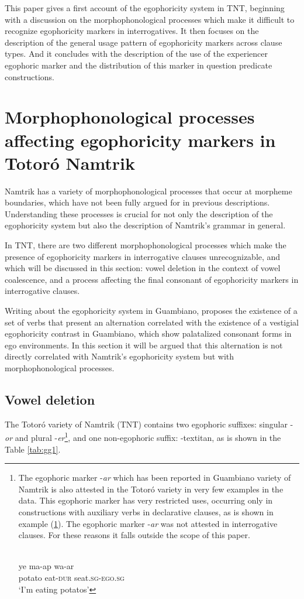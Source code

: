 \documentclass[output=paper]{langsci/langscibook}
\begin{document}
This paper gives a first account of the egophoricity system in TNT, beginning with a discussion on the morphophonological processes which make it difficult to recognize egophoricity markers in interrogatives. It then focuses on the description of the general usage pattern of egophoricity markers across clause types. And it concludes with the description of the use of the experiencer egophoric marker and the distribution of this marker in question predicate constructions.
  

\section{Morphophonological processes affecting egophoricity markers in Totoró Namtrik}\label{s:gg1}

Namtrik has a variety of morphophonological processes that occur at morpheme boundaries, which have not been fully argued for in previous descriptions. Understanding these processes is crucial for not only the description of the egophoricity system but also the description of Namtrik’s grammar in general. 

In TNT, there are two different morphophonological processes which make the presence of egophoricity markers in interrogative clauses unrecognizable, and which will be discussed in this section: vowel deletion in the context of vowel coalescence, and a process affecting the final consonant of egophoricity markers in interrogative clauses.

Writing about the egophoricity system in Guambiano, \citet{Norcliffe2018} proposes the existence of a set of verbs that present an alternation correlated with the existence of a vestigial egophoricity contrast in Guambiano, which show palatalized consonant forms in ego environments. In this section it will be argued that this alternation is not directly correlated with Namtrik’s egophoricity system but with morphophonological processes. 


\subsection{Vowel deletion}\label{s:gg1-1}

The Totoró variety of Namtrik (TNT) contains two egophoric suffixes: singular -\textit{or} and plural -\textit{er}\footnote{
	The egophoric marker -\textit{ar} which has been reported in Guambiano variety of Namtrik is also attested in the Totoró variety in very few examples in the data. This egophoric marker has very restricted uses, occurring only in constructions with auxiliary verbs in declarative clauses, as is shown in example (\ref{ex:gg-FN}). The egophoric marker -\textit{ar} was not attested in interrogative clauses. For these reasons it falls outside the scope of this paper.
	
	\ea\label{ex:gg-FN}
    \\
	\gll  ye	 ma-ap wa-ar \\
      potato eat-\textsc{dur} seat.\textsc{sg-ego.sg}\\
	\glt ‘I’m eating potatos’
	\z
	}, and one non-egophoric suffix: -textit{an}, as is shown in the Table \ref{tab:gg1}.
	
\end{document}
